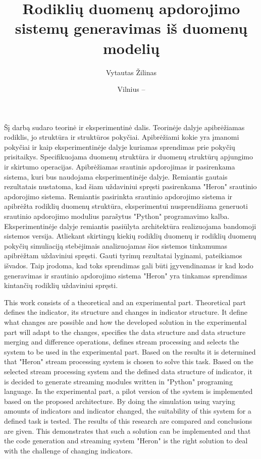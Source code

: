 \documentclass{VUMIFPSbakalaurinis}
\title{Rodiklių duomenų apdorojimo sistemų generavimas iš duomenų modelių}
\author{Vytautas Žilinas}
\date{Vilnius – \the\year}
\begin{document}
 
\maketitle

\cleardoublepage{}
\setcounter{page}{2}

Šį darbą sudaro teorinė ir eksperimentinė dalis. Teorinėje dalyje apibrėžiamas rodiklis, jo struktūra ir struktūros pokyčiai. Apibrėžiami kokie yra įmanomi pokyčiai ir kaip eksperimentinėje dalyje kuriamas sprendimas prie pokyčių prisitaikys. Specifikuojama duomenų struktūra ir duomenų struktūrų apjungimo ir skirtumo operacijas. Apibrėžiamas srautinis apdorojimas ir pasirenkama sistema, kuri bus naudojama eksperimentinėje dalyje. Remiantis gautais rezultatais
nustatoma, kad šiam uždaviniui spręsti pasirenkama "Heron" srautinio apdorojimo sistema. Remiantis pasirinkta srautinio apdorojimo sistema ir apibrėžta rodiklių duomenų struktūra, eksperimentui nusprendžiama generuoti srautinio apdorojimo modulius parašytus "Python" programavimo kalba. Eksperimentinėje dalyje remiantis pasiūlyta architektūra realizuojama bandomoji sistemos versija. Atliekant skirtingų kiekių rodiklių duomenų ir rodiklių duomenų pokyčių simuliaciją stebėjimais analizuojamas šios sistemos tinkamumas apibrėžtam uždaviniui spręsti. Gauti tyrimų rezultatai lyginami, pateikiamos išvados. Taip įrodoma, kad toks sprendimas gali būti įgyvendinamas ir kad kodo generavimas ir srautinio apdorojimo sistema "Heron" yra tinkamas sprendimas kintančių rodiklių uždaviniui spręsti.

This work consists of a theoretical and an experimental part. Theoretical part defines the indicator, its structure and changes in indicator structure. It define what changes are possible and how the developed solution in the experimental part will adapt to the changes, specifies the data structure and data structure merging and difference operations, defines stream processing and selects the system to be used in the experimental part. Based on the results it is determined that "Heron" stream processing system is chosen to solve this task. Based on the selected stream processing system and the defined data structure of indicator, it is decided to generate streaming modules written in "Python" programing language. In the experimental part, a pilot version of the system is implemented based on the proposed architecture. By doing the simulation using varying amounts of indicators and indicator changed, the suitability of this system for a defined task is tested. The results of this research are compared and conclusions are given. This demonstrates that such a solution can be implemented and that the code generation and streaming system "Heron" is the right solution to deal with the challenge of changing indicators.
\end{document}
